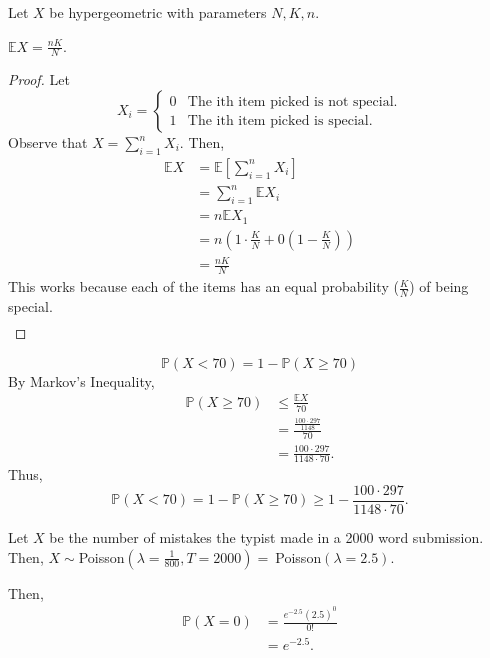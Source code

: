 \documentclass[12pt]{article}
\begin{document}
\newpage
{} Let $X$ be hypergeometric with parameters $N, K, n$.

\medskip
{} $\mathbb EX = \frac{nK}{N}$.
\begin{proof}
    Let $$X_i = \begin{cases} 0 & \text{The ith item picked is not special.} \\ 1 & \text{The ith item picked is special.} \end{cases}$$
    Observe that $X = \sum\limits_{i=1}^{n} X_i$. Then,
    \begin{align*}
        \mathbb EX &= \mathbb E[\sum\limits_{i=1}^{n} X_i] \\
                   &= \sum\limits_{i=1}^{n} \mathbb EX_i \\
                   &= n \mathbb EX_1 \\
                   &= n (1 \cdot \frac KN + 0 (1- \frac KN)) \\
                   &= \frac{nK}{N}
    \end{align*}
    This works because each of the items has an equal probability ($\frac KN$) of being special.
    \begin{align*}
    \end{align*}
\end{proof}
\medskip
{}
    $$\mathbb P(X < 70) = 1 - \mathbb P(X \geq 70)$$
    By Markov's Inequality,
    \begin{align*}
        \mathbb P(X \geq 70) &\leq \frac{\mathbb EX}{70} \\
                             &= \frac{\frac{100 \cdot 297}{1148}}{70} \\
                             &= \frac{100 \cdot 297}{1148 \cdot 70}.
    \end{align*}
    Thus,
    $$\mathbb P(X < 70) = 1 - \mathbb P(X \geq 70) \geq 1 - \frac{100 \cdot 297}{1148 \cdot 70}.$$

\newpage
{}

\medskip
{} Let $X$ be the number of mistakes the typist made in a 2000 word submission. Then, $X\sim$Poisson$(\lambda=\frac1{800}, T=2000) =~$Poisson$(\lambda=2.5)$.
    
    Then,
    \begin{align*}
        \mathbb P(X = 0) &= \frac{e^{-2.5}(2.5)^0}{0!} \\
                         &= e^{-2.5}.
    \end{align*}
    
\end{document}
